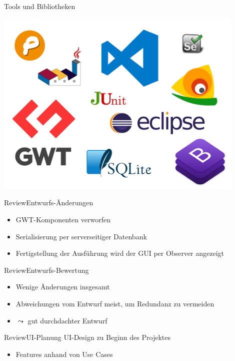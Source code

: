 \documentclass[10pt]{beamer}
\begin{document}
\begin{frame}{Tools und Bibliotheken}{}
	\begin{center}
    \includegraphics[width=0.9\textwidth]{img/alle}
	\end{center}
\end{frame}

\begin{frame}{Review}{Entwurfs-Änderungen}
	\begin{itemize}
		\item GWT-Komponenten verworfen
		\item Serialisierung per serverseitiger Datenbank
		\item Fertigstellung der Ausführung wird der GUI per Observer angezeigt
	\end{itemize}
\end{frame}

\begin{frame}{Review}{Entwurfs-Bewertung}
	\begin{itemize}
		\item Wenige Änderungen insgesamt
		\item Abweichungen vom Entwurf meist, um Redundanz zu vermeiden
		\item [] $\leadsto$ gut durchdachter Entwurf
	\end{itemize}
\end{frame}

\begin{frame}{Review}{UI-Planung}
UI-Design zu Beginn des Projektes
	\begin{itemize}
		\item Features anhand von Use Cases
	\end{itemize}
\end{frame}
\end{document}
